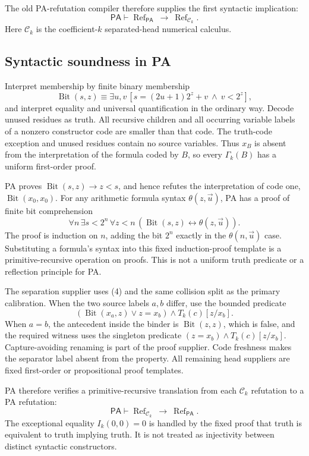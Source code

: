 \documentclass[10pt,letterpaper]{article}
\newcommand{\PA}{\mathsf{PA}}
\newcommand{\Bit}{\operatorname{Bit}}
\begin{document}
The old PA-refutation compiler therefore supplies the first syntactic implication:
\[
 \PA\vdash\operatorname{Ref}_{\PA}\ \longrightarrow\
                  \operatorname{Ref}_{\mathcal C_k}.       \tag{3}
\]
Here $\mathcal C_k$ is the coefficient-$k$ separated-head numerical calculus.

\subsection{Syntactic soundness in PA}

Interpret membership by finite binary membership
\[
 \Bit(s,z)\equiv\exists u,v\,[s=(2u+1)2^z+v\ \wedge\ v<2^z],
\]
and interpret equality and universal quantification in the ordinary way. Decode unused residues as truth. All recursive children and all occurring variable labels of a nonzero constructor code are smaller than that code. The truth-code exception and unused residues contain no source variables. Thus $x_B$ is absent from the interpretation of the formula coded by $B$, so every $\Gamma_k(B)$ has a uniform first-order proof.

PA proves $\Bit(s,z)\to z<s$, and hence refutes the interpretation of code one, $\Bit(x_0,x_0)$. For any arithmetic formula syntax $\theta(z,\vec u)$, PA has a proof of finite bit comprehension
\[
 \forall n\,\exists s<2^n\,\forall z<n\,
       (\Bit(s,z)\leftrightarrow\theta(z,\vec u)).          \tag{4}
\]
The proof is induction on $n$, adding the bit $2^n$ exactly in the $\theta(n,\vec u)$ case. Substituting a formula's syntax into this fixed induction-proof template is a primitive-recursive operation on proofs. This is not a uniform truth predicate or a reflection principle for PA.

The separation supplier uses (4) and the same collision split as the primary calibration. When the two source labels $a,b$ differ, use the bounded predicate
\[
 (\Bit(x_a,z)\lor z=x_b)\wedge T_k(c)[z/x_b].
\]
When $a=b$, the antecedent inside the binder is $\Bit(z,z)$, which is false, and the required witness uses the singleton predicate
$(z=x_b)\wedge T_k(c)[z/x_b]$. Capture-avoiding renaming is part of the proof supplier. Code freshness makes the separator label absent from the property. All remaining head suppliers are fixed first-order or propositional proof templates.

PA therefore verifies a primitive-recursive translation from each $\mathcal C_k$ refutation to a PA refutation:
\[
 \PA\vdash\operatorname{Ref}_{\mathcal C_k}\ \longrightarrow\
                  \operatorname{Ref}_{\PA}.                \tag{5}
\]
The exceptional equality $I_k(0,0)=0$ is handled by the fixed proof that truth is equivalent to truth implying truth. It is not treated as injectivity between distinct syntactic constructors.
\end{document}
